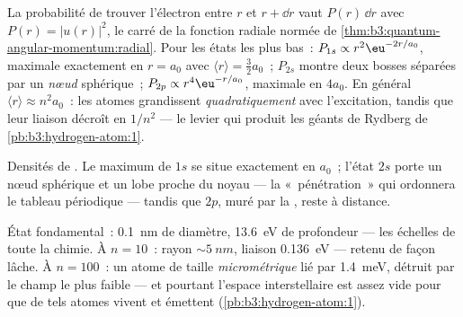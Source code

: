 \begin{proposition}\label{prop:b3:hydrogen-atom:radial}
La probabilité de trouver l'électron entre $r$ et $r + \dd r$ vaut
$P(r)\,\dd r$ avec $P(r) = |u(r)|^2$, le carré de la fonction radiale
normée de \cref{thm:b3:quantum-angular-momentum:radial}. Pour les
états les plus bas~: $P_{1s} \propto r^2\eu^{-2r/a_0}$, maximale
exactement en $r = a_0$ avec $\langle r\rangle = \tfrac32 a_0$~;
$P_{2s}$ montre deux bosses séparées par un \emph{nœud} sphérique~; $P_{2p} \propto
r^4\eu^{-r/a_0}$, maximale en $4a_0$. En général $\langle r\rangle
\approx n^2a_0$~: les atomes grandissent \emph{quadratiquement} avec
l'excitation, tandis que leur liaison décroît en $1/n^2$ --- le levier
qui produit les géants de Rydberg de \cref{pb:b3:hydrogen-atom:1}.
\end{proposition}
\admitted

\begin{omfigure}

{\small Densités de . Le maximum de $1s$ se situe
exactement en $a_0$~; l'état $2s$ porte un nœud sphérique et un lobe
proche du noyau --- la «~pénétration~» qui ordonnera le tableau
périodique --- tandis que $2p$, muré par la , reste
à distance.}
\end{omfigure}

\begin{example}\label{ex:b3:hydrogen-atom:sizes}
État fondamental~: \qty{0.1}{nm} de diamètre, \qty{13.6}{eV} de
profondeur --- les échelles de toute la chimie. À $n = 10$~: rayon
$\sim\qty{5}{nm}$, liaison \qty{0.136}{eV} --- retenu de façon lâche.
À $n = 100$~: un atome de taille \emph{micrométrique} lié par
\qty{1.4}{meV}, détruit par le champ le plus faible --- et pourtant
l'espace interstellaire est assez vide pour que de tels atomes vivent
et émettent (\cref{pb:b3:hydrogen-atom:1}).
\end{example}

